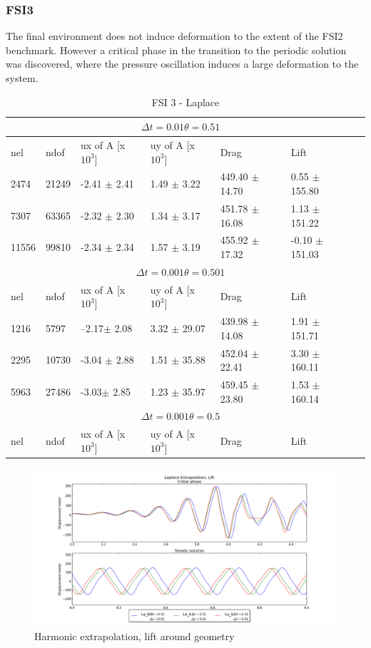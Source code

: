 \subsubsection{FSI3}
The final environment does not induce deformation to the extent of the FSI2 benchmark. However a critical phase in the transition to the periodic solution was discovered, where the pressure oscillation induces a large deformation to the system.

\begin{table}[h!]
\centering
\caption{FSI 3 - Laplace}
\label{my-label}
\begin{tabular}{ |p{1cm}||p{1cm}|p{2.5cm}|p{2.5cm}|p{2.7cm}|p{2.7cm}|p{1.2cm}|}
 \hline
  \multicolumn{6}{|c|}{$\Delta t = 0.01 \theta = 0.51$} \\
   \hline
nel & ndof & ux of A [x $10^{3}$]  &uy of A [x $10^{3}$]& Drag  & Lift \\
 \hline
 2474    & 21249  & -2.41      $\pm$ 2.41 & 1.49       $\pm$ 3.22 & 449.40       $\pm$ 14.70 & 0.55       $\pm$ 155.80  \\
 7307    & 63365  & -2.32       $\pm$ 2.30 & 1.34       $\pm$ 3.17 & 451.78       $\pm$ 16.08 & 1.13       $\pm$ 151.22  \\
 11556   & 99810  & -2.34       $\pm$ 2.34 & 1.57       $\pm$ 3.19 & 455.92       $\pm$ 17.32 & -0.10       $\pm$ 151.03 \\
 \hline
  \multicolumn{6}{|c|}{$\Delta t = 0.001 \theta = 0.501$} \\
   \hline
 nel & ndof & ux of A [x $10^{3}$]  &uy of A [x $10^{3}$]& Drag  & Lift \\
1216 &5797& --2.17$\pm$  2.08 &     3.32     $\pm$  29.07 &439.98 $\pm$  14.08  &  1.91 $\pm$  151.71\\
2295 &10730& -3.04 $\pm$  2.88 &  1.51  $\pm$  35.88 & 452.04  $\pm$  22.41 &  3.30      $\pm$  160.11 \\
5963 &27486 & -3.03$\pm$  2.85 &  1.23 $\pm$  35.97  & 459.45  $\pm$  23.80 &  1.53  $\pm$  160.14 \\
\hline
\multicolumn{6}{|c|}{$\Delta t = 0.001 \theta = 0.5$} \\
   \hline
 nel & ndof & ux of A [x $10^{3}$]  &uy of A [x $10^{3}$]& Drag  & Lift \\
\hline
\end{tabular}
\end{table}
\newpage
\begin{figure}
    \includegraphics[scale=0.5]{./Fig/la_lift.png}
      \caption{Harmonic extrapolation, lift around geometry}
\end{figure}

